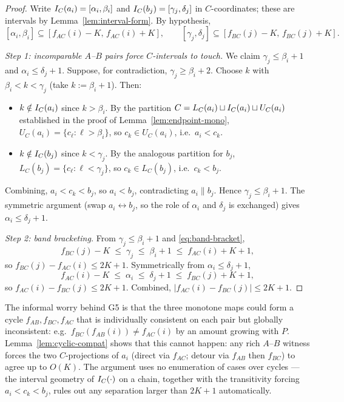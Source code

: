 \begin{proof}
Write $I_C(a_i) = [\alpha_i, \beta_i]$ and $I_C(b_j) = [\gamma_j, \delta_j]$
in $C$-coordinates; these are intervals by Lemma~\ref{lem:interval-form}.
By hypothesis,
\begin{equation}\label{eq:band-bracket}
[\alpha_i, \beta_i] \subseteq [f_{AC}(i) - K,\, f_{AC}(i) + K],\qquad
[\gamma_j, \delta_j] \subseteq [f_{BC}(j) - K,\, f_{BC}(j) + K].
\end{equation}

\smallskip
\noindent\emph{Step 1: incomparable $A$--$B$ pairs force $C$-intervals to
touch.} We claim $\gamma_j \le \beta_i + 1$ and $\alpha_i \le \delta_j + 1$.
Suppose, for contradiction, $\gamma_j \ge \beta_i + 2$. Choose $k$ with
$\beta_i < k < \gamma_j$ (take $k := \beta_i + 1$). Then:
\begin{itemize}[nosep]
  \item $k \notin I_C(a_i)$ since $k > \beta_i$. By the partition
    $C = L_C(a_i) \sqcup I_C(a_i) \sqcup U_C(a_i)$ established in the proof
    of Lemma~\ref{lem:endpoint-mono}, $U_C(a_i) = \{c_\ell : \ell > \beta_i\}$,
    so $c_k \in U_C(a_i)$, i.e.\ $a_i < c_k$.
  \item $k \notin I_C(b_j)$ since $k < \gamma_j$. By the analogous
    partition for $b_j$, $L_C(b_j) = \{c_\ell : \ell < \gamma_j\}$, so
    $c_k \in L_C(b_j)$, i.e.\ $c_k < b_j$.
\end{itemize}
Combining, $a_i < c_k < b_j$, so $a_i < b_j$, contradicting $a_i \parallel b_j$.
Hence $\gamma_j \le \beta_i + 1$. The symmetric argument (swap $a_i
\leftrightarrow b_j$, so the role of $\alpha_i$ and $\delta_j$ is exchanged)
gives $\alpha_i \le \delta_j + 1$.

\smallskip
\noindent\emph{Step 2: band bracketing.} From $\gamma_j \le \beta_i + 1$ and
\eqref{eq:band-bracket},
\[
f_{BC}(j) - K \;\le\; \gamma_j \;\le\; \beta_i + 1 \;\le\; f_{AC}(i) + K + 1,
\]
so $f_{BC}(j) - f_{AC}(i) \le 2K + 1$. Symmetrically from
$\alpha_i \le \delta_j + 1$,
\[
f_{AC}(i) - K \;\le\; \alpha_i \;\le\; \delta_j + 1 \;\le\; f_{BC}(j) + K + 1,
\]
so $f_{AC}(i) - f_{BC}(j) \le 2K + 1$. Combined, $|f_{AC}(i) - f_{BC}(j)| \le 2K + 1$.
\end{proof}

\begin{remark}
The informal worry behind G5 is that the three monotone maps could form a
cycle $f_{AB}, f_{BC}, f_{AC}$ that is individually consistent on each pair
but globally inconsistent: e.g.\ $f_{BC}(f_{AB}(i)) \neq f_{AC}(i)$ by an
amount growing with $P$. Lemma~\ref{lem:cyclic-compat} shows that this
cannot happen: any rich $A$--$B$ witness forces the two $C$-projections of
$a_i$ (direct via $f_{AC}$; detour via $f_{AB}$ then $f_{BC}$) to agree up
to $O(K)$. The argument uses no enumeration of cases over cycles --- the
interval geometry of $I_C(\cdot)$ on a chain, together with the transitivity
forcing $a_i < c_k < b_j$, rules out any separation larger than $2K+1$
automatically.
\end{remark}

